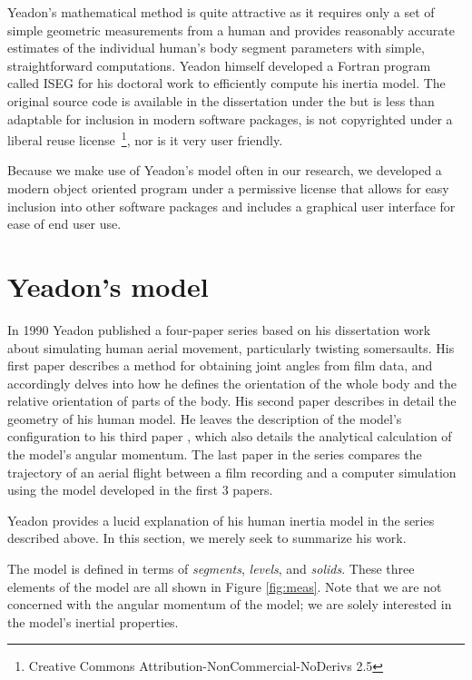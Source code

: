 \documentclass[10pt]{article}
\begin{document}
Yeadon's mathematical method is quite attractive as it requires only a set of
simple geometric measurements from a human and provides reasonably accurate
estimates of the individual human's body segment parameters with simple,
straightforward computations. Yeadon himself developed a Fortran program called
ISEG for his doctoral work \cite{Yeadon1984a} to efficiently compute his
inertia model. The original source code is available in the dissertation under
the but is less than adaptable for inclusion in modern software packages, is
not copyrighted under a liberal reuse license~\footnote{Creative Commons
Attribution-NonCommercial-NoDerivs 2.5}, nor is it very user friendly.

Because we make use of Yeadon's model often in our research, we developed a
modern object oriented program under a permissive license that allows for easy
inclusion into other software packages and includes a graphical user interface
for ease of end user use.

\section*{Yeadon's model}

In 1990 Yeadon published a four-paper series based on his dissertation work
about simulating human aerial movement, particularly twisting somersaults. His
first paper \cite{Yeadon1990c} describes a method for obtaining joint angles
from film data, and accordingly delves into how he defines the orientation of
the whole body and the relative orientation of parts of the body. His second
paper \cite{Yeadon1990f} describes in detail the geometry of his human model.
He leaves the description of the model's configuration to his third paper
\cite{Yeadon1990e}, which also details the analytical calculation of the
model's angular momentum. The last paper in the series \cite{Yeadon1990d}
compares the trajectory of an aerial flight between a film recording and a
computer simulation using the model developed in the first 3 papers.

Yeadon provides a lucid explanation of his human inertia model in the series
described above. In this section, we merely seek to summarize his work.

The model is defined in terms of \emph{segments}, \emph{levels}, and
\emph{solids}. These three elements of the model are all shown in Figure
\ref{fig:meas}. Note that we are not concerned with the angular momentum of the
model; we are solely interested in the model's inertial properties.
\end{document}
